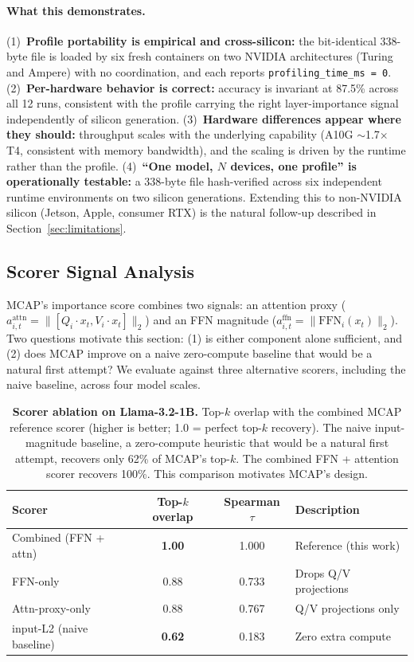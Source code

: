 \documentclass{article}
\begin{document}
\paragraph{What this demonstrates.} (1)~\textbf{Profile portability is empirical
and cross-silicon:} the bit-identical 338-byte file is loaded by six fresh
containers on two NVIDIA architectures (Turing and Ampere) with no
coordination, and each reports \texttt{profiling\_time\_ms = 0}.
(2)~\textbf{Per-hardware behavior is correct:} accuracy is invariant at 87.5\%
across all 12 runs, consistent with the profile carrying the right
layer-importance signal independently of silicon generation.
(3)~\textbf{Hardware differences appear where they should:} throughput scales
with the underlying capability (A10G $\sim$1.7$\times$ T4, consistent with
memory bandwidth), and the scaling is driven by the runtime rather than the
profile. (4)~\textbf{``One model, $N$ devices, one profile'' is operationally
testable:} a 338-byte file hash-verified across six independent runtime
environments on two silicon generations. Extending this to non-NVIDIA silicon
(Jetson, Apple, consumer RTX) is the natural follow-up described in
Section~\ref{sec:limitations}.


\subsection{Scorer Signal Analysis}
\label{sec:scorer}

MCAP's importance score combines two signals: an attention proxy
($a_{i,t}^{\text{attn}} = \|[Q_i \cdot x_t, V_i \cdot x_t]\|_2$) and an FFN
magnitude ($a_{i,t}^{\text{ffn}} = \|\text{FFN}_i(x_t)\|_2$). Two questions
motivate this section: (1) is either component alone sufficient, and (2) does
MCAP improve on a naive zero-compute baseline that would be a natural first
attempt? We evaluate against three alternative scorers, including the naive
baseline, across four model scales.

\begin{table}[H]
\centering
\caption{\textbf{Scorer ablation on Llama-3.2-1B.} Top-$k$ overlap with the
combined MCAP reference scorer (higher is better; 1.0 = perfect top-$k$
recovery). The naive input-magnitude baseline, a zero-compute heuristic that
would be a natural first attempt, recovers only 62\% of MCAP's top-$k$. The
combined FFN + attention scorer recovers 100\%. This comparison motivates
MCAP's design.}
\label{tab:scorer_ablation}
\small
\begin{tabular}{lccl}
\toprule
Scorer & Top-$k$ overlap & Spearman $\tau$ & Description \\
\midrule
Combined (FFN + attn) & \textbf{1.00} & 1.000 & Reference (this work) \\
FFN-only & 0.88 & 0.733 & Drops Q/V projections \\
Attn-proxy-only & 0.88 & 0.767 & Q/V projections only \\
\rowcolor{nvered!10}
input-L2 (naive baseline) & \textbf{0.62} & 0.183 & Zero extra compute \\
\bottomrule
\end{tabular}
\end{table}
\end{document}
